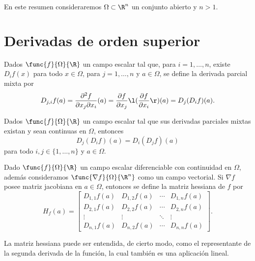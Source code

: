 \documentclass[a4,11pt]{aleph-notas}
\begin{document}
\encabezado

En este resumen consideraremos $\Omega\subset \R^n$ un conjunto abierto y $n>1$.

\section{Derivadas de orden superior}

\begin{defi}
    Dados $\func{f}{\Omega}{\R}$ un campo escalar tal que, para $i=1,\ldots, n$, existe $D_if(x)$ para todo $x\in \Omega$, para $j=1,\ldots, n$ y $a\in \Omega$, se define la derivada parcial mixta por
    \[
        D_{j,i} f(a)=\frac{\partial^2 f}{\partial x_j\partial x_i}(a)
        =\frac{\partial f}{\partial x_j}\l( \frac{\partial f}{\partial x_i}\r)(a)
        =D_j(D_i f)(a).
    \]
\end{defi}

\begin{teo}
    Dados $\func{f}{\Omega}{\R}$ un campo escalar tal que sus derivadas parciales mixtas existan y sean continuas en $\Omega$, entonces
    \[
        D_j(D_i f)(a) = D_i(D_j f)(a)
    \]
    para todo $i,j\in\{1,\ldots, n\}$ y $a\in \Omega$.
\end{teo}

\begin{defi}
    Dado $\func{f}{\Omega}{\R}$ un campo escalar diferenciable con continuidad en $\Omega$, además consideramos $\func{\nabla f}{\Omega}{\R^n}$ como un campo vectorial. Si $\nabla f$ posee matriz jacobiana en $a\in \Omega$, entonces se define la matriz hessiana de $f$ por
    \[
        H_f(a)=
        \begin{bmatrix}
         D_{1,1}f(a) & D_{1,2}f(a) & \cdots & D_{1,n}f(a) \\
         D_{2,1}f(a) & D_{2,2}f(a) & \cdots & D_{2,n}f(a) \\
         \vdots & \vdots &  \ddots & \vdots\\
         D_{n,1}f(a) & D_{n,2}f(a) & \cdots & D_{n,n}f(a)
        \end{bmatrix}.
    \]
\end{defi}

\begin{advertencia}
    La matriz hessiana puede ser entendida, de cierto modo, como el representante de la segunda derivada de la función, la cual también es una aplicación lineal.
\end{advertencia}
\end{document}
